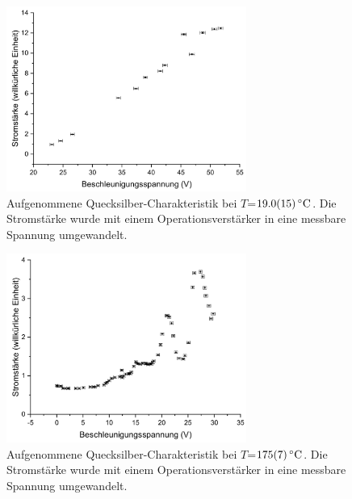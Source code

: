 \documentclass[
	a4paper,
	12pt,
	pagesize,
	ngerman
]{scrartcl}
\begin{document}
	
	
	
	
	
	
	
	
	
	
	
	\begin{figure}[H]
		\includegraphics[width=0.7\textwidth]{Hg19}
		\centering
		\caption{Aufgenommene Quecksilber-Charakteristik bei $T$=$\SI{19,0 +- 1,5}{\degreeCelsius}$. Die Stromstärke wurde mit einem Operationsverstärker in eine messbare Spannung umgewandelt.}
		\label{Hg19}
		\centering
	\end{figure}

	\begin{figure}[H]
		\includegraphics[width=0.7\textwidth]{Hg175}
		\centering
		\caption{Aufgenommene Quecksilber-Charakteristik bei $T$=$\SI{175 +- 7}{\degreeCelsius}$. Die Stromstärke wurde mit einem Operationsverstärker in eine messbare Spannung umgewandelt.}
		\label{Hg175}
		\centering
	\end{figure}
\end{document}
